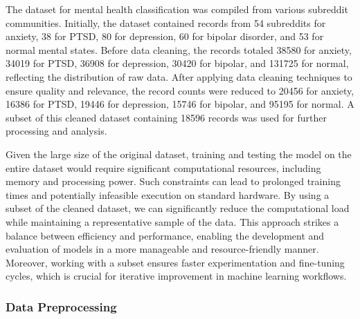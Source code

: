 \noindent
The dataset for mental health classification was compiled from various subreddit communities. Initially, the dataset contained records from 54 subreddits for anxiety, 38 for PTSD, 80 for depression, 60 for bipolar disorder, and 53 for normal mental states. Before data cleaning, the records totaled 38580 for anxiety, 34019 for PTSD, 36908 for depression, 30420 for bipolar, and 131725 for normal, reflecting the distribution of raw data. After applying data cleaning techniques to ensure quality and relevance, the record counts were reduced to 20456 for anxiety, 16386 for PTSD, 19446 for depression, 15746 for bipolar, and 95195 for normal. A subset of this cleaned dataset containing 18596 records was used for further processing and analysis.

\vspace{1em}

\noindent
Given the large size of the original dataset, training and testing the model on the entire dataset would require significant computational resources, including memory and processing power. Such constraints can lead to prolonged training times and potentially infeasible execution on standard hardware. By using a subset of the cleaned dataset, we can significantly reduce the computational load while maintaining a representative sample of the data. This approach strikes a balance between efficiency and performance, enabling the development and evaluation of models in a more manageable and resource-friendly manner. Moreover, working with a subset ensures faster experimentation and fine-tuning cycles, which is crucial for iterative improvement in machine learning workflows.

\pagebreak

\subsubsection{Data Preprocessing}

